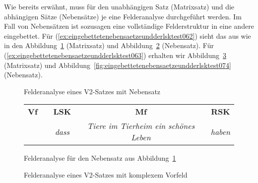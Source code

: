 Wie bereits erwähnt, muss für den unabhängigen Satz (Matrixsatz) und die abhängigen Sätze (Nebensätze) je eine Felderanalyse durchgeführt werden.
Im Fall von Nebensätzen ist sozusagen eine vollständige Felderstruktur in eine andere eingebettet.
Für (\ref{ex:eingebettetenebensaetzeundderlsktest062}) sieht das aus wie in den Abbildung~\ref{fig:eingebettetenebensaetzeundderlsktest071} (Matrixsatz) und Abbildung~\ref{fig:eingebettetenebensaetzeundderlsktest072} (Nebensatz).
Für (\ref{ex:eingebettetenebensaetzeundderlsktest063}) erhalten wir Abbildung~\ref{fig:eingebettetenebensaetzeundderlsktest073} (Matrixsatz) und Abbildung~\ref{fig:eingebettetenebensaetzeundderlsktest074} (Nebensatz).

\begin{figure}[!htbp]
  \centering
  \caption{Felderanalyse eines V2-Satzes mit Nebensatz}
  \label{fig:eingebettetenebensaetzeundderlsktest071}
\end{figure}

\begin{figure}[!htbp]
  \centering
  \begin{tabular}{cp{0.1em}cp{0.1em}cp{0.1em}c}
    \textbf{Vf} && \textbf{LSK} && \textbf{Mf} && \textbf{RSK} \\
    \cmidrule{1-1}\cmidrule{3-3}\cmidrule{5-5}\cmidrule{7-7}
    && \textit{dass} && \textit{Tiere im Tierheim ein schönes Leben} && \textit{haben} \\
  \end{tabular}
  \caption{Felderanalyse für den Nebensatz aus Abbildung~\ref{fig:eingebettetenebensaetzeundderlsktest071}}
  \label{fig:eingebettetenebensaetzeundderlsktest072}
\end{figure}

\begin{figure}[!htbp]
  \centering
  \caption{Felderanalyse eines V2-Satzes mit komplexem Vorfeld}
  \label{fig:eingebettetenebensaetzeundderlsktest073}
\end{figure}

